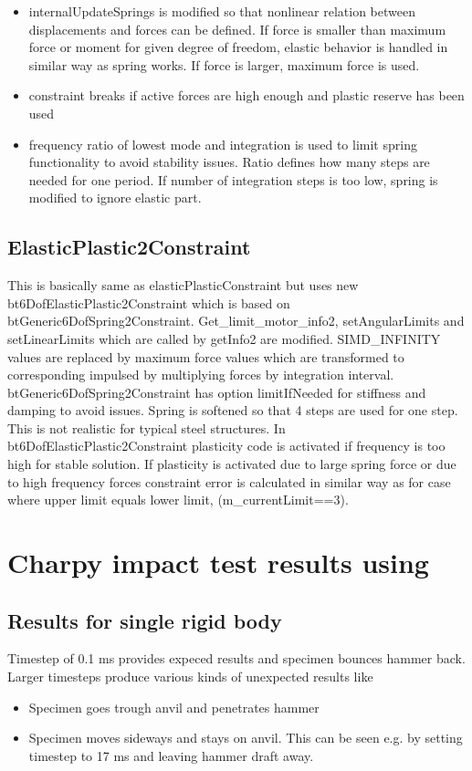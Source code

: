 \begin{itemize}
\item internalUpdateSprings is modified so that nonlinear relation between displacements and forces can be defined. 
 If force is smaller than maximum force or moment for given degree of freedom,
  elastic behavior is handled in similar way as spring works. 
  If force is larger, maximum force is used. 
\item constraint breaks if active forces are high enough and plastic reserve has been used
\item frequency ratio of lowest mode and integration is used to limit spring functionality to avoid stability issues. 
 Ratio defines how many steps are needed for one period. 
 If number of integration steps is too low, spring is modified to ignore elastic part.
\end{itemize}

\subsection{ElasticPlastic2Constraint}
This is basically same as elasticPlasticConstraint but uses new bt6DofElasticPlastic2Constraint 
which is based on btGeneric6DofSpring2Constraint.
Get\_limit\_motor\_info2, setAngularLimits and setLinearLimits which are called by getInfo2 are modified. 
SIMD\_INFINITY values are replaced by maximum force values which are transformed to
corresponding impulsed by multiplying forces by integration interval.
btGeneric6DofSpring2Constraint has option limitIfNeeded for stiffness and damping to avoid issues. 
Spring is softened so that 4 steps are used for one step. This is not realistic for typical steel structures. 
In bt6DofElasticPlastic2Constraint plasticity code is activated if frequency is too high for stable solution.
If plasticity is activated due to large spring force or due to high frequency forces constraint error is 
calculated in similar way as for case where upper limit equals lower limit, (m\_currentLimit==3).

\section{Charpy impact test results using \bullet}
\label{sec:bullet-charpy-results}

\subsection{Results for single rigid body}
Timestep of 0.1 ms provides expeced results and specimen bounces hammer back.
Larger timesteps produce various kinds of unexpected results like
\begin{itemize}
\item Specimen goes trough anvil and penetrates hammer
\item Specimen moves sideways and stays on anvil. This can be seen e.g. by setting timestep to 17 ms and leaving hammer draft away.
\end{itemize}

